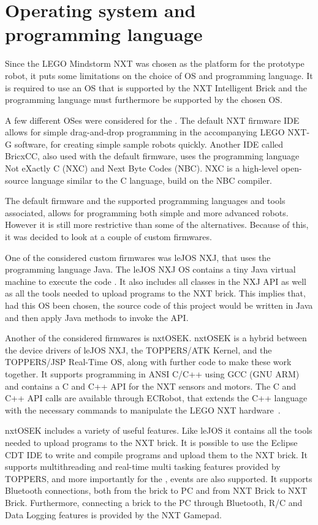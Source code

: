 \section{Operating system and programming language} \label{sec:os_and_proglanguage}
Since the LEGO Mindstorm NXT was chosen as the platform for the prototype robot, it puts some limitations on the choice of OS and programming language. It is required to use an OS that is supported by the NXT Intelligent Brick and the programming language must furthermore be supported by the chosen OS.

A few different OSes were considered for the \projname{}. The default NXT firmware IDE allows for simple drag-and-drop programming in the accompanying LEGO NXT-G software, for creating simple sample robots quickly. Another IDE called BricxCC, also used with the default firmware, uses the programming language Not eXactly C (NXC) and Next Byte Codes (NBC). NXC is a high-level open-source language similar to the C language, build on the NBC compiler. 

The default firmware and the supported programming languages and tools associated, allows for programming both simple and more advanced robots. However it is still more restrictive than some of the alternatives. Because of this, it was decided to look at a couple of custom firmwares.  

One of the considered custom firmwares was leJOS NXJ, that uses the programming language Java. The leJOS NXJ OS contains a tiny Java virtual machine to execute the code \citep{lejos}. It also includes all classes in the NXJ API \citep{nxj} as well as all the tools needed to upload programs to the NXT brick. This implies that, had this OS been chosen, the source code of this project would be written in Java and then apply Java methods to invoke the API.

Another of the considered firmwares is nxtOSEK. nxtOSEK is a hybrid between the device drivers of leJOS NXJ, the TOPPERS/ATK Kernel, and the TOPPERS/JSP Real-Time OS, along with further code to make these work together. It supports programming in ANSI C/C++ using GCC (GNU ARM) and contains a C and C++ API for the NXT sensors and motors. The C and C++ API calls are available through ECRobot, that extends the C++ language with the necessary commands to manipulate the LEGO NXT hardware~\citep{nxtosek, toppers_atk, toppers_jsp, nxtOSEK2, nxtosek_api}.

nxtOSEK includes a variety of useful features. Like leJOS it contains all the tools needed to upload programs to the NXT brick. It is possible to use the Eclipse CDT IDE to write and compile programs and upload them to the NXT brick. It supports multithreading and real-time multi tasking features provided by TOPPERS, and more importantly for the \projname{}, events are also supported. It supports Bluetooth connections, both from the brick to PC and from NXT Brick to NXT Brick. Furthermore, connecting a brick to the PC through Bluetooth, R/C and Data Logging features is provided by the NXT Gamepad.

